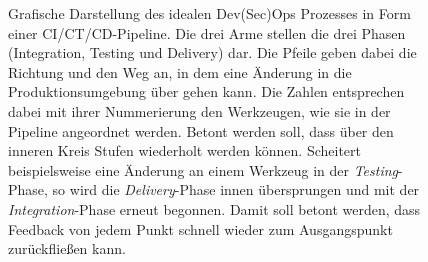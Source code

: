 \begin{figure}[p]
    \vspace*{1cm}
    \setlength{\abovecaptionskip}{10pt}
    \setlength{\belowcaptionskip}{0pt}
    \centering
    \caption{Grafische Darstellung des \glqq idealen\grqq{} Dev(Sec)Ops Prozesses in Form einer CI/CT/CD-Pipeline. 
    Die drei Arme stellen die drei Phasen (Integration, Testing und Delivery) dar. Die Pfeile geben dabei die Richtung und den Weg an, in dem eine Änderung in die Produktionsumgebung über gehen kann. 
    Die Zahlen entsprechen dabei mit ihrer Nummerierung den Werkzeugen, wie sie in der Pipeline angeordnet werden. 
    Betont werden soll, dass über den inneren Kreis Stufen wiederholt werden können. Scheitert beispielsweise eine Änderung an einem Werkzeug in der \emph{Testing}-Phase, so wird die \emph{Delivery}-Phase innen übersprungen und mit der \emph{Integration}-Phase erneut begonnen. 
    Damit soll betont werden, dass Feedback von jedem Punkt schnell wieder zum Ausgangspunkt zurückfließen kann. }
    \label{fig:cicdprocess}
\end{figure}